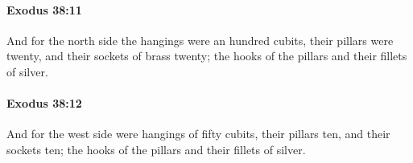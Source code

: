 		\paragraph{Exodus 38:11} %
			\label{EXODUS-38-11}

			And for the north side the hangings were an hundred cubits, their pillars were twenty, and their sockets of brass twenty; the hooks of the pillars and their fillets of silver.


		\paragraph{Exodus 38:12} %
			\label{EXODUS-38-12}

			And for the west side were hangings of fifty cubits, their pillars ten, and their sockets ten; the hooks of the pillars and their fillets of silver.


